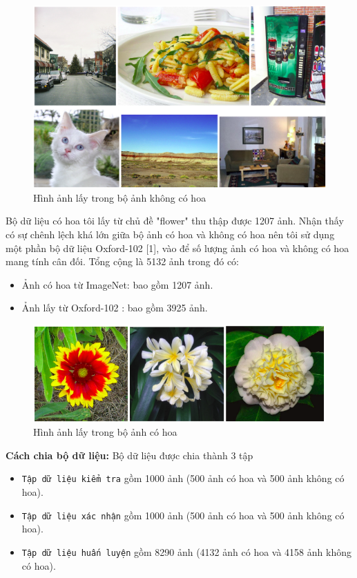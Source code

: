 \documentclass[12pt]{report}
\begin{document}
				
		\begin{figure}[h]
			\centering
			\includegraphics[scale=0.4]{nonflower}
			\caption{Hình ảnh lấy trong bộ ảnh không có hoa}
			\label{fig:nonflower}
		\end{figure}
				
		Bộ dữ liệu có hoa tôi lấy từ chủ đề "flower" thu thập được 1207 ảnh. Nhận thấy có sự chênh lệch khá lớn giữa bộ ảnh có hoa và không có hoa nên tôi sử dụng một phần bộ dữ liệu Oxford-102 [1], vào để số lượng ảnh có hoa và không có hoa mang tính cân đối. Tổng cộng là 5132 ảnh trong đó có:
		\begin{itemize}
			\item Ảnh có hoa từ ImageNet: bao gồm 1207 ảnh.
			\item Ảnh lấy từ Oxford-102	: bao gồm 3925 ảnh.
		\end{itemize}
				
		\begin{figure}[h]
			\centering
			\includegraphics[scale=0.6]{anhcohoa}
			\caption{Hình ảnh lấy trong bộ ảnh có hoa}
			\label{fig:anhcohoa}
		\end{figure}
				
		\textbf{Cách chia bộ dữ liệu:} Bộ dữ liệu được chia thành 3 tập
		\begin{itemize}
			\item \texttt{Tập dữ liệu kiểm tra} gồm 1000 ảnh (500 ảnh có hoa và 500 ảnh không có hoa).
			\item \texttt{Tập dữ liệu xác nhận} gồm 1000 ảnh (500 ảnh có hoa và 500 ảnh không có hoa).
			\item \texttt{Tập dữ liệu huấn luyện} gồm 8290 ảnh (4132 ảnh có hoa và 4158 ảnh không có hoa).
		\end{itemize}
				
\end{document}

